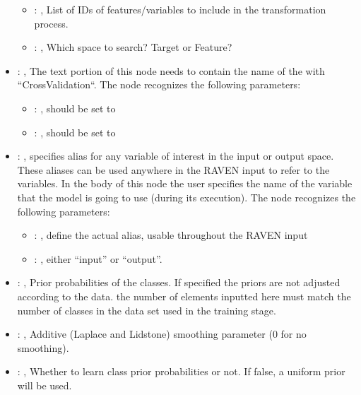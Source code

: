 \begin{itemize}
\begin{itemize}
        \item {}: , 
          List of IDs of features/variables to include in the transformation process.

        \item {}: , 
          Which space to search? Target or Feature?
      \end{itemize}

    \item {}: , 
      The text portion of this node needs to contain the name of the  with
               ``CrossValidation``.
      The  node recognizes the following parameters:
        \begin{itemize}
          \item {}: , 
            should be set to 
          \item {}: , 
            should be set to 
      \end{itemize}

    \item {}: , 
      specifies alias for         any variable of interest in the input or output space. These
      aliases can be used anywhere in the RAVEN input to         refer to the variables. In the body
      of this node the user specifies the name of the variable that the model is going to use
      (during its execution).
      The  node recognizes the following parameters:
        \begin{itemize}
          \item {}: , 
            define the actual alias, usable throughout the RAVEN input
          \item {}: , 
            either ``input'' or ``output''.
      \end{itemize}

    \item {}: , 
      Prior probabilities of the classes. If specified the priors are
      not adjusted according to the data. \nb the number of elements inputted here must
      match the number of classes in the data set used in the training stage.

    \item {}: , 
      Additive (Laplace and Lidstone) smoothing parameter (0 for no smoothing).

    \item {}: , 
      Whether to learn class prior probabilities or not. If false, a uniform
      prior will be used.
  \end{itemize}


